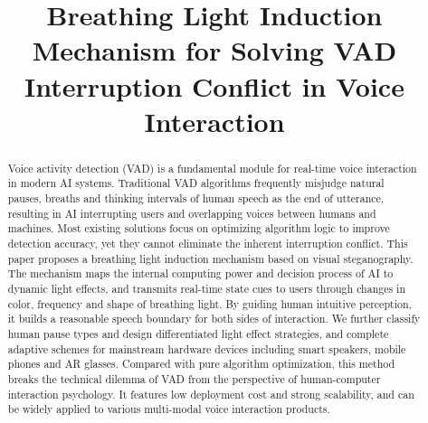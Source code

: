\documentclass{article}
\title{Breathing Light Induction Mechanism for Solving VAD Interruption Conflict in Voice
Interaction}
\author{}
\date{}
\begin{document}
\maketitle
\begin{abstract}
Voice activity detection (VAD) is a fundamental module for real-time voice interaction in
modern AI systems. Traditional VAD algorithms frequently misjudge natural pauses, breaths
and thinking intervals of human speech as the end of utterance, resulting in AI interrupting
users and overlapping voices between humans and machines. Most existing solutions focus
on optimizing algorithm logic to improve detection accuracy, yet they cannot eliminate the
inherent interruption conflict. This paper proposes a breathing light induction mechanism
based on visual steganography. The mechanism maps the internal computing power and
decision process of AI to dynamic light effects, and transmits real-time state cues to users
through changes in color, frequency and shape of breathing light. By guiding human intuitive
perception, it builds a reasonable speech boundary for both sides of interaction. We further
classify human pause types and design differentiated light effect strategies, and complete
adaptive schemes for mainstream hardware devices including smart speakers, mobile
phones and AR glasses. Compared with pure algorithm optimization, this method breaks the
technical dilemma of VAD from the perspective of human-computer interaction psychology. It
features low deployment cost and strong scalability, and can be widely applied to various
multi-modal voice interaction products.
\end{abstract}
\end{document}
